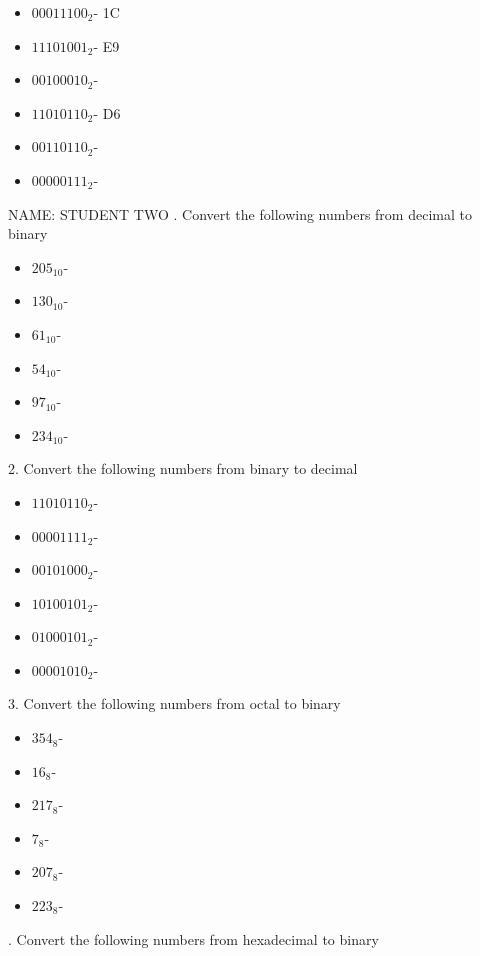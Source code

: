 \documentclass[a4paper,12pt]{article}
\begin{document}
\begin{itemize}
\item $00011100_{2}$\quad - \quad 1C
\item $11101001_{2}$\quad - \quad E9
\item $00100010_{2}$\quad - 
\item $11010110_{2}$\quad - \quad D6
\item $00110110_{2}$\quad - 
\item $00000111_{2}$\quad - 
\end{itemize}\newpage
NAME: STUDENT TWO
\newline{}. Convert the following numbers from decimal to binary
\begin{itemize}
\item $205_{10}$\quad - 
\item $130_{10}$\quad - 
\item $61_{10}$\quad - 
\item $54_{10}$\quad - 
\item $97_{10}$\quad - 
\item $234_{10}$\quad - 
\end{itemize}
2. Convert the following numbers from binary to decimal 
\begin{itemize}
\item $11010110_{2}$\quad - 
\item $00001111_{2}$\quad - 
\item $00101000_{2}$\quad - 
\item $10100101_{2}$\quad - 
\item $01000101_{2}$\quad - 
\item $00001010_{2}$\quad - 
\end{itemize}
3. Convert the following numbers from octal to binary 
\begin{itemize}
\item $354_{8}$\quad - 
\item $16_{8}$\quad - 
\item $217_{8}$\quad - 
\item $7_{8}$\quad - 
\item $207_{8}$\quad - 
\item $223_{8}$\quad - 
\end{itemize}. Convert the following numbers from hexadecimal to binary 
\end{document}
